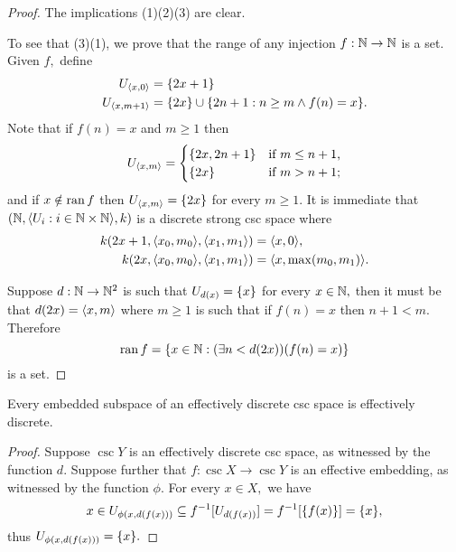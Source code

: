 \documentclass[csc]{subfiles}
\begin{document}
\begin{proof}
  The implications (1)\THEN(2)\THEN(3) are clear.

  To see that (3)\THEN(1), we prove that the range of any injection \(f:\mathbb{N}\to\mathbb{N}\) is a set.
  Given \(f,\) define \[\begin{aligned}
      U_{\langle x,0\rangle} &= \lbrace2x+1\rbrace \\
      U_{\langle x,m+1\rangle} &= \lbrace2x\rbrace\cup\lbrace2n+1 : n \geq m \land f(n) = x\rbrace.
    \end{aligned}\]
  Note that if \(f(n) = x\) and \(m \geq 1\) then \[U_{\langle x,m\rangle} = \begin{cases}
      \lbrace2x,2n+1\rbrace & \text{if $m \leq n+1$,} \\
      \lbrace2x\rbrace & \text{if $m > n+1$;}
    \end{cases}\] and if \(x \notin \operatorname{ran}\nolimits f\) then \(U_{\langle x,m\rangle} = \lbrace2x\rbrace\) for every \(m \geq 1.\)
  It is immediate that \((\mathbb{N},\langle U_i : i \in \mathbb{N}\times\mathbb{N}\rangle,k)\) is a discrete strong csc space where \[\begin{aligned}
      k(2x+1,\langle x_0,m_0\rangle,\langle x_1,m_1\rangle) &= \langle x,0\rangle, \\
      k(2x,\langle x_0,m_0\rangle,\langle x_1,m_1\rangle) &= \langle x,\max(m_0,m_1)\rangle.
    \end{aligned}\]

  Suppose \(d:\mathbb{N} \to \mathbb{N}^2\) is such that \(U_{d(x)} = \lbrace x\rbrace\) for every \(x \in \mathbb{N},\) then it must be that \(d(2x) = \langle x,m\rangle\) where \(m \geq 1\) is such that if \(f(n) = x\) then \(n + 1 < m.\) 
  Therefore \[\operatorname{ran}\nolimits f = \lbrace x \in \mathbb{N} : (\exists n < d(2x))(f(n) = x)\rbrace\] is a set.
\end{proof}

\begin{proposition}[\RCA]\label{P:SubDiscrete}
  Every embedded subspace of an effectively discrete csc space is effectively discrete.
\end{proposition}

\begin{proof}
  Suppose \(\csc{Y}\) is an effectively discrete csc space, as witnessed by the function \(d.\)
  Suppose further that \(f:\csc{X}\to\csc{Y}\) is an effective embedding, as witnessed by the function \(\phi.\)
  For every \(x \in X,\) we have \[x \in U_{\phi(x,d(f(x)))} \subseteq f^{-1}[U_{d(f(x))}] = f^{-1}[\{f(x)\}] = \lbrace x\rbrace,\] thus \(U_{\phi(x,d(f(x)))} = \lbrace x\rbrace.\)
\end{proof}
\end{document}

